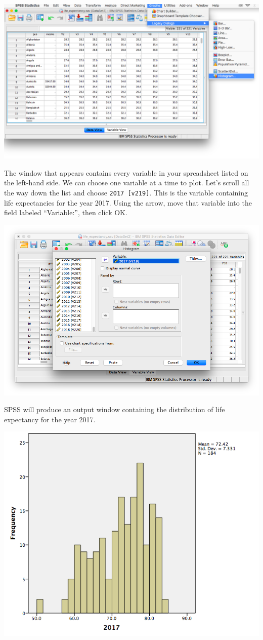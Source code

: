 \documentclass[
]{book}
\begin{document}
\includegraphics{img/1.4.18.png}

The window that appears contains every variable in your spreadsheet listed on the left-hand side. We can choose one variable at a time to plot. Let's scroll all the way down the list and choose \texttt{2017\ {[}v219{]}}. This is the variable containing life expectancies for the year 2017. Using the arrow, move that variable into the field labeled ``Variable:'', then click {OK}.

\includegraphics{img/1.4.19.png}

SPSS will produce an output window containing the distribution of life expectancy for the year 2017.

\includegraphics{img/1.4.20.png}
\end{document}

